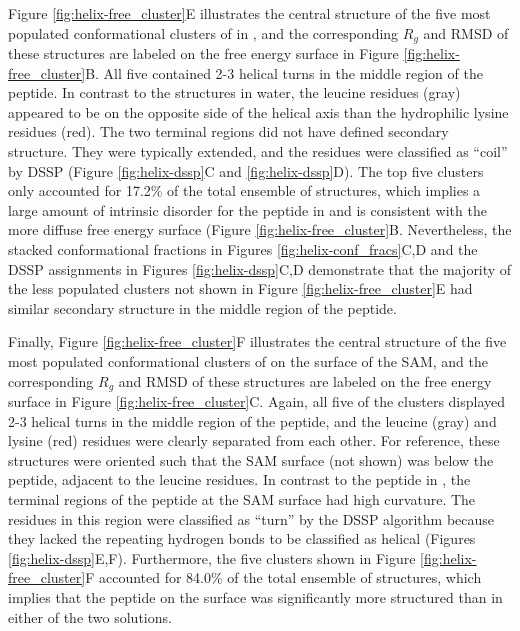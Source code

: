 Figure \ref{fig:helix-free_cluster}E illustrates the central structure of the five most populated conformational clusters of \pep{} in \tbawat{}, and the corresponding $R_g$ and RMSD of these structures are labeled on the free energy surface in Figure \ref{fig:helix-free_cluster}B. 
All five contained 2-3 helical turns in the middle region of the peptide. 
In contrast to the structures in water, the leucine residues (gray) appeared to be on the opposite side of the helical axis than the hydrophilic lysine residues (red). 
The two terminal regions did not have defined secondary structure. 
They were typically extended, and the residues were classified as ``coil'' by DSSP (Figure \ref{fig:helix-dssp}C and \ref{fig:helix-dssp}D). 
The top five clusters only accounted for 17.2\% of the total ensemble of structures, which implies a large amount of intrinsic disorder for the peptide in \tbawat{} and is consistent with the more diffuse free energy surface (Figure \ref{fig:helix-free_cluster}B. 
Nevertheless, the stacked conformational fractions in Figures \ref{fig:helix-conf_fracs}C,D and the DSSP assignments in Figures \ref{fig:helix-dssp}C,D demonstrate that the majority of the less populated clusters not shown in Figure \ref{fig:helix-free_cluster}E had similar secondary structure in the middle region of the peptide.

Finally, Figure \ref{fig:helix-free_cluster}F illustrates the central structure of the five most populated conformational clusters of \pep{} on the surface of the SAM, and the corresponding $R_g$ and RMSD of these structures are labeled on the free energy surface in Figure \ref{fig:helix-free_cluster}C. 
Again, all five of the clusters displayed 2-3 helical turns in the middle region of the peptide, and the leucine (gray) and lysine (red) residues were clearly separated from each other. 
For reference, these structures were oriented such that the SAM surface (not shown) was below the peptide, adjacent to the leucine residues. 
In contrast to the peptide in \tbawat{}, the terminal regions of the peptide at the SAM surface had high curvature. 
The residues in this region were classified as ``turn'' by the DSSP algorithm because they lacked the repeating hydrogen bonds to be classified as helical (Figures \ref{fig:helix-dssp}E,F). 
Furthermore, the five clusters shown in Figure \ref{fig:helix-free_cluster}F accounted for 84.0\% of the total ensemble of structures, which implies that the peptide on the surface was significantly more structured than in either of the two solutions.

